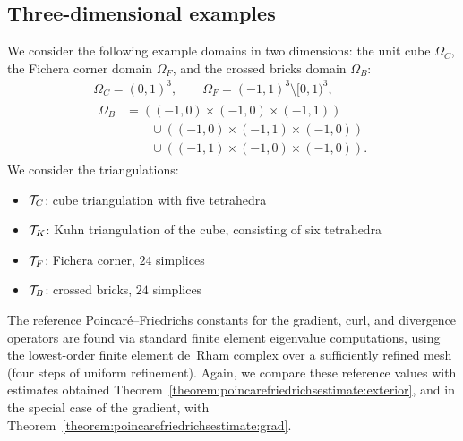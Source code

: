 \documentclass[10pt,a4paper]{article}
\begin{document}
\subsection{Three-dimensional examples}

We consider the following example domains in two dimensions:
the unit cube $\Omega_C$, the Fichera corner domain $\Omega_F$, and the crossed bricks domain $\Omega_{B}$:
\begin{gather*}
    \Omega_{C}  = ( 0,1)^3,
    \qquad 
    \Omega_{F}  = (-1,1)^3 \setminus [0,1)^3,
    \\
    \begin{aligned}
    \Omega_{B} &= 
    \left( (-1,0) \times (-1,0) \times (-1,1) \right)
    \\&\qquad
    \cup 
    \left( (-1,0) \times (-1,1) \times (-1,0) \right)
    \\&\qquad
    \cup 
    \left( (-1,1) \times (-1,0) \times (-1,0) \right)
    .
    \end{aligned}
\end{gather*}
We consider the triangulations: 
\begin{itemize}
    \item ${\mathcal T}_{C}$: cube triangulation with five tetrahedra
    \item ${\mathcal T}_{K}$: Kuhn triangulation of the cube, consisting of six tetrahedra
    \item ${\mathcal T}_{F}$: Fichera corner, $24$ simplices 
    \item ${\mathcal T}_{B}$: crossed bricks, $24$ simplices 
\end{itemize}

The reference Poincar\'e--Friedrichs constants for the gradient, curl, and divergence operators are found via standard finite element eigenvalue computations, using the lowest-order finite element de~Rham complex over a sufficiently refined mesh (four steps of uniform refinement).
Again, we compare these reference values with estimates obtained Theorem~\ref{theorem:poincarefriedrichsestimate:exterior}, and in the special case of the gradient, with Theorem~\ref{theorem:poincarefriedrichsestimate:grad}.

\end{document}
